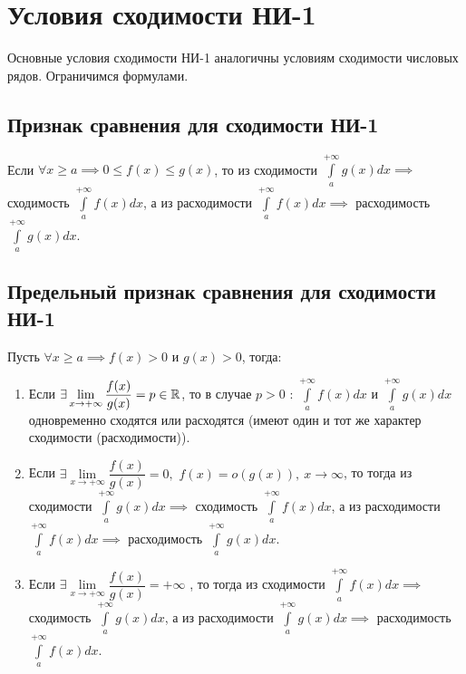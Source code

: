 \documentclass[../../main.tex]{subfiles}
\begin{document}
\section{Условия сходимости НИ-1}
Основные условия сходимости НИ-1 аналогичны условиям сходимости числовых рядов.
Ограничимся формулами.
\subsection{Признак сравнения для сходимости НИ-1}
Если $\forall x \geq a \implies 0 \leq f(x) \leq g(x)$, то из
сходимости $\int\limits_a^{+\infty} g(x)dx \implies$ сходимость
$\int\limits_a^{+\infty} f(x)dx$, а из расходимости
$\int\limits_a^{+\infty} f(x)dx \implies$
расходимость $\int\limits_a^{+\infty} g(x)dx$.
\subsection{Предельный признак сравнения для сходимости НИ-1}
Пусть $\forall x \geq a \implies f(x) > 0$ и $g(x) > 0$, тогда:
\begin{enumerate}
    \item Если $\exists \lim\limits_{x \to +\infty} \dfrac{f(x)}{g(x)} = p
    \in \mathbb{R}$, то в случае $p > 0$ :
    $\int\limits_a^{+\infty} f(x)dx$ и $\int\limits_a^{+\infty} g(x)dx $
    одновременно сходятся или расходятся (имеют один и тот же характер
    сходимости (расходимости)).
    \item Если $\exists \lim\limits_{x \to +\infty} \dfrac{f(x)}{g(x)} = 0,$
    $f(x) = o(g(x)), \ x \to \infty$, то тогда из сходимости
    $\int\limits_a^{+\infty} g(x)dx \implies$ сходимость
    $\int\limits_a^{+\infty} f(x)dx$, а из расходимости
    $\int\limits_a^{+\infty} f(x)dx \implies$ расходимость
    $\int\limits_a^{+\infty} g(x)dx$.
    \item Если $\exists \lim\limits_{x \to +\infty}
    \dfrac{f(x)}{g(x)} = +\infty$
    , то тогда из сходимости
    $\int\limits_a^{+\infty} f(x)dx \implies$ сходимость
    $\int\limits_a^{+\infty} g(x)dx$, а из расходимости
    $\int\limits_a^{+\infty} g(x)dx \implies$ расходимость
    $\int\limits_a^{+\infty} f(x)dx$.
\end{enumerate}

\begin{crl*}
\end{crl*}
\end{document}
